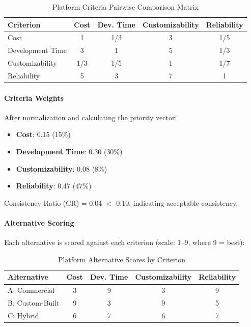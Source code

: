 \begin{table}[H]
\centering
\caption{Platform Criteria Pairwise Comparison Matrix}
\begin{tabular}{lcccc}
\toprule
\textbf{Criterion} & \textbf{Cost} & \textbf{Dev. Time} & \textbf{Customizability} & \textbf{Reliability} \\
\midrule
Cost & 1 & 1/3 & 3 & 1/5 \\
Development Time & 3 & 1 & 5 & 1/3 \\
Customizability & 1/3 & 1/5 & 1 & 1/7 \\
Reliability & 5 & 3 & 7 & 1 \\
\bottomrule
\end{tabular}
\end{table}

\paragraph{Criteria Weights}
After normalization and calculating the priority vector:
\begin{itemize}
    \item \textbf{Cost}: 0.15 (15\%)
    \item \textbf{Development Time}: 0.30 (30\%)
    \item \textbf{Customizability}: 0.08 (8\%)
    \item \textbf{Reliability}: 0.47 (47\%)
\end{itemize}

Consistency Ratio (CR) = 0.04 $<$ 0.10, indicating acceptable consistency.

\paragraph{Alternative Scoring}
Each alternative is scored against each criterion (scale: 1--9, where 9 = best):

\begin{table}[H]
\centering
\caption{Platform Alternative Scores by Criterion}
\begin{tabular}{lcccc}
\toprule
\textbf{Alternative} & \textbf{Cost} & \textbf{Dev. Time} & \textbf{Customizability} & \textbf{Reliability} \\
\midrule
A: Commercial & 3 & 9 & 3 & 9 \\
B: Custom-Built & 9 & 3 & 9 & 5 \\
C: Hybrid & 6 & 7 & 6 & 7 \\
\bottomrule
\end{tabular}
\end{table}


